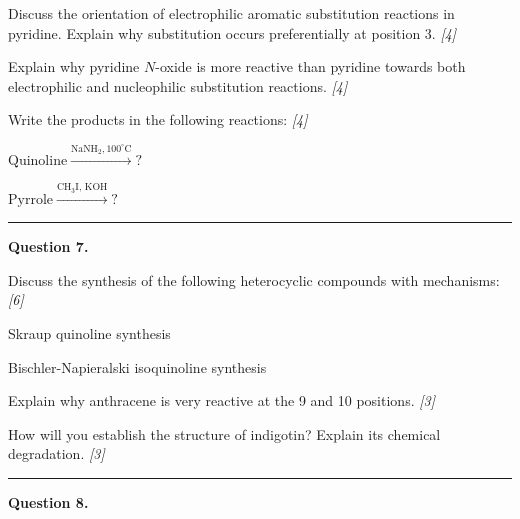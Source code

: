 \documentclass[11pt,a4paper]{article}
\newcommand{\pts}[1]{\hfill   \textit{[#1]}}
\begin{document}
\begin{parts}
  \item Discuss the orientation of electrophilic aromatic substitution reactions in pyridine. Explain why substitution occurs preferentially at position 3. \pts{4}
  \item Explain why pyridine $N$-oxide is more reactive than pyridine towards both electrophilic and nucleophilic substitution reactions. \pts{4}
  \item Write the products in the following reactions: \pts{4}
  
\begin{parts}
    \item $ \text{Quinoline} \xrightarrow{ \text{NaNH}_2, 100^\circ \text{C}} ?$
    \item $ \text{Pyrrole} \xrightarrow{ \text{CH}_3 \text{I, KOH}} ?$
  \end{parts}
\end{parts}

\medskip\rule{\linewidth}{0.2pt}




\noindent   \textbf{Question 7.}

\begin{parts}
  \item Discuss the synthesis of the following heterocyclic compounds with mechanisms: \pts{6}
  
\begin{parts}
    \item Skraup quinoline synthesis
    \item Bischler-Napieralski isoquinoline synthesis
  \end{parts}
  \item Explain why anthracene is very reactive at the 9 and 10 positions. \pts{3}
  \item How will you establish the structure of indigotin? Explain its chemical degradation. \pts{3}
\end{parts}

\medskip\rule{\linewidth}{0.2pt}




\noindent   \textbf{Question 8.}
\end{document}
